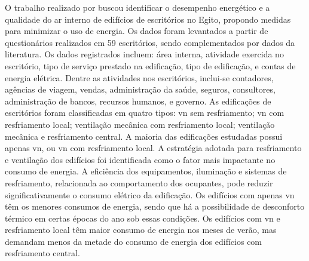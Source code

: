 O trabalho realizado por  buscou identificar o desempenho energético e a qualidade do ar interno de edifícios de escritórios no Egito, propondo medidas para minimizar o uso de energia. Os dados foram levantados a partir de questionários realizados em 59 escritórios, sendo complementados por dados da literatura. Os dados registrados incluem: área interna, atividade exercida no escritório, tipo de serviço prestado na edificação, tipo de edificação, e contas de energia elétrica. Dentre as atividades nos escritórios, inclui-se contadores, agências de viagem, vendas, administração da saúde, seguros, consultores, administração de bancos, recursos humanos, e governo. As edificações de escritórios foram classificadas em quatro tipos: \acrshort{vn} sem resfriamento; \acrshort{vn} com resfriamento local; ventilação mecânica com resfriamento local; ventilação mecânica e resfriamento central. A maioria das edificações estudadas possui apenas \acrlong{vn}, ou \acrshort{vn} com resfriamento local. A estratégia adotada para resfriamento e ventilação dos edifícios foi identificada como o fator mais impactante no consumo de energia. A eficiência dos equipamentos, iluminação e sistemas de resfriamento, relacionada ao comportamento dos ocupantes, pode reduzir significativamente o consumo elétrico da edificação. 
Os edifícios com apenas \acrshort{vn} têm os menores consumos de energia, sendo que há a possibilidade de desconforto térmico em certas épocas do ano sob essas condições. Os edifícios com \acrshort{vn} e resfriamento local têm maior consumo de energia nos meses de verão, mas demandam menos da metade do consumo de energia dos edifícios com resfriamento central.


